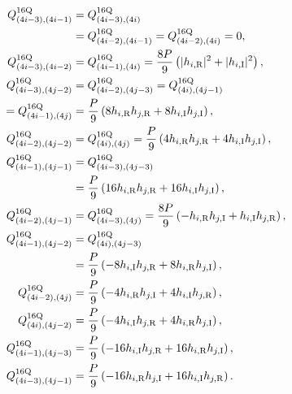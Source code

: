 {\allowdisplaybreaks
	\begin{align}
	\label{16q_Q_zero}
	Q_{(4i-3),(4i-1)}^{16{\rm Q}} &= Q_{(4i-3),(4i)}^{16{\rm Q}}  \nonumber \\
	&= Q_{(4i-2),(4i-1)}^{16{\rm Q}} = Q_{(4i-2),(4i)}^{16{\rm Q}} = 0, \\
	\label{16q_Q_odd_even}
	Q_{(4i-3),(4i-2)}^{16{\rm Q}} &= Q_{(4i-1),(4i)}^{16{\rm Q}} = \frac{8 P}{9} \left( |h_{i,{\rm R}}|^2 + |h_{i,{\rm I}}|^2 \right), \\
	\label{16q_Qij_Eq7}
	Q_{(4i-3),(4j-2)}^{16{\rm Q}} &= Q_{(4i-2),(4j-3)}^{16{\rm Q}} = Q_{(4i),(4j-1)}^{16{\rm Q}} \nonumber \\
	= Q_{(4i-1),(4j)}^{16{\rm Q}} &= 
	\frac{P}{9} \left( 8 h_{i,{\rm R}} h_{j,{\rm R}} + 8 h_{i,{\rm I}} h_{j,{\rm I}} \right), \\
	\label{16q_Qij_even}
	Q_{(4i-2),(4j-2)}^{16{\rm Q}} &= Q_{(4i),(4j)}^{16{\rm Q}} = \frac{P}{9} \left( 4 h_{i,{\rm R}} h_{j,{\rm R}} + 4 h_{i,{\rm I}} h_{j,{\rm I}} \right), \\
	\label{16q_Qij_odd}
	Q_{(4i-1),(4j-1)}^{16{\rm Q}} &= Q_{(4i-3),(4j-3)}^{16{\rm Q}}  \nonumber\\
	&= \frac{P}{9} \left( 16 h_{i,{\rm R}} h_{j,{\rm R}} + 16 h_{i,{\rm I}} h_{j,{\rm I}} \right), \\
	\label{16q_Qij_Eq8}
	Q_{(4i-2),(4j-1)}^{16{\rm Q}} &= Q_{(4i-3),(4j)}^{16{\rm Q}} = \frac{8 P}{9} \left( - h_{i,{\rm R}} h_{j,{\rm I}} + h_{i,{\rm I}} h_{j,{\rm R}} \right), \\
	\label{16q_Qij_Eq9}
	Q_{(4i-1),(4j-2)}^{16{\rm Q}} &= Q_{(4i),(4j-3)}^{16{\rm Q}} \nonumber \\
	&= \frac{P}{9} \left( -8 h_{i,{\rm I}} h_{j,{\rm R}} + 8 h_{i,{\rm R}} h_{j,{\rm I}} \right), \\
	\label{16q_Qij_Eq10}
	Q_{(4i-2),(4j)}^{16{\rm Q}} &= 
	\frac{P}{9} \left( -4 h_{i,{\rm R}} h_{j,{\rm I}} + 4 h_{i,{\rm I}} h_{j,{\rm R}} \right), \\
	\label{16q_Qij_Eq11}
	Q_{(4i),(4j-2)}^{16{\rm Q}} &= 
	\frac{P}{9} \left( -4 h_{i,{\rm I}} h_{j,{\rm R}} + 4 h_{i,{\rm R}} h_{j,{\rm I}} \right), \\
	\label{16q_Qij_Eq12}
	Q_{(4i-1),(4j-3)}^{16{\rm Q}} &= 
	\frac{P}{9} \left( -16 h_{i,{\rm I}} h_{j,{\rm R}} + 16 h_{i,{\rm R}} h_{j,{\rm I}} \right), \\
	\label{16q_Qij_Eq13}
	Q_{(4i-3),(4j-1)}^{16{\rm Q}} &= 
	\frac{P}{9} \left( -16 h_{i,{\rm R}} h_{j,{\rm I}} + 16 h_{i,{\rm I}} h_{j,{\rm R}} \right).
\end{align}}
